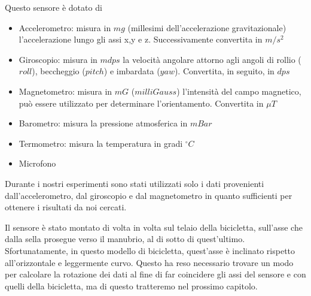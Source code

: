 \documentclass[class=article]{standalone}
\begin{document}
	Questo sensore è dotato di
	\begin{itemize}
		\item Accelerometro: misura in \(mg\) (millesimi dell'accelerazione gravitazionale) l'accelerazione lungo gli assi x,y e z. Successivamente convertita in \(m/s^2\)
		\item Giroscopio: misura in \(mdps\) la velocità angolare attorno agli angoli di rollio (\(roll\)), beccheggio (\(pitch\)) e imbardata (\(yaw\)). Convertita, in seguito, in \(dps\)
		\item Magnetometro: misura in \(mG\) (\(milli Gauss\)) l'intensità del campo magnetico, può essere utilizzato per determinare l'orientamento. Convertita in \(\mu T\)
		\item Barometro: misura la pressione atmosferica in \(mBar\)
		\item Termometro: misura la temperatura in gradi \(^{\circ}C\)
		\item Microfono
	\end{itemize}
	
	Durante i nostri esperimenti sono stati utilizzati solo i dati provenienti dall'accelerometro, dal giroscopio e dal magnetometro in quanto sufficienti per ottenere i risultati da noi cercati.
		
	Il sensore è stato montato di volta in volta sul telaio della bicicletta, sull'asse che dalla sella prosegue verso il manubrio, al di sotto di quest'ultimo. Sfortunatamente, in questo modello di bicicletta, quest'asse è inclinato rispetto all'orizzontale e leggermente curvo. Questo ha reso necessario trovare un modo per calcolare la rotazione dei dati al fine di far coincidere gli assi del sensore e con quelli della bicicletta, ma di questo tratteremo nel prossimo capitolo.\hfill\break
	
\end{document}
